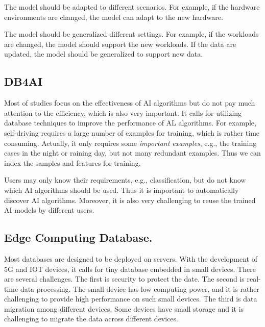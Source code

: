  The model should be adapted to different scenarios. For example, if the hardware environments are changed, the model can adapt to the new hardware. %
  
 The model should be generalized different settings. For example, if the workloads are changed, the model should support the new workloads. If the data are updated, the model should be generalized to support new data. 
 

\subsection{DB4AI}

 Most of studies focus on the effectiveness of AI algorithms but do not pay much attention to the efficiency, which is also very important. It calls for utilizing database techniques to improve the performance of AL algorithms. For example,  self-driving requires a large number of examples for training, which is rather time consuming. Actually, it only requires some {\it important examples}, e.g., the training cases in the night or raining day, but not many redundant examples. Thus we can index the samples and features for training.


 Users may only know their requirements, e.g., classification, but do not know which AI algorithms should be used. Thus it is important to automatically discover AI algorithms. Moreover, it is also very challenging to reuse the trained AI models by different users. 




\subsection{Edge Computing Database.} Most databases are designed to be deployed on servers. With the development of 5G and IOT devices, it calls for tiny database embedded in small devices. There are several challenges. The first is security to protect the date. The second is real-time data processing. The small device has low computing power, and it is rather challenging to provide high performance on such small devices. The third is data migration among different devices. Some devices have small storage and it is challenging to migrate the data across different devices. 

